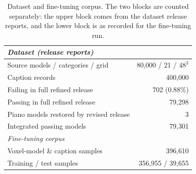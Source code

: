\begin{table}[t]
\centering
\small
\setlength{\tabcolsep}{4pt}
\begin{tabular}{lr}
\toprule
\multicolumn{2}{l}{\emph{Dataset (release reports)}} \\
\midrule
Source models / categories / grid & 80,000 / 21 / $48^3$ \\
Caption records & 400,000 \\
Failing in full refined release & 702 (0.88\%) \\
Passing in full refined release & 79,298 \\
Piano models restored by revised release & 3 \\
Integrated passing models & 79,301 \\
\midrule
\multicolumn{2}{l}{\emph{Fine-tuning corpus}} \\
\midrule
Voxel-model \& caption samples & 396,610 \\ %
Training / %
test samples & 356,955 / 39,655 \\
\bottomrule
\end{tabular}
\caption{Dataset and fine-tuning corpus. The two blocks are counted separately: the upper block comes from the dataset release reports, and the lower block is as recorded for the fine-tuning run.}
\label{tab:training-data}
\end{table}
